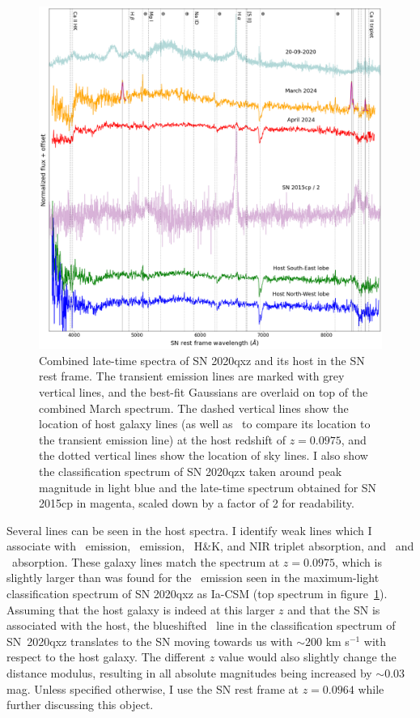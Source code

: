 \documentclass[a4paper,oneside,12pt, class=Latex/Classes/PhDthesisPSnPDF, crop=false]{standalone}
\begin{document}
\begin{figure}[h!]
    \centering
    \includegraphics[width=\textwidth]{../Images/chapter_5/2020qxz_spec.png}
    \caption[Spectra of SN 2020qxz.]{Combined late-time spectra of SN 2020qxz and its host in the SN rest frame. The transient emission lines are marked with grey vertical lines, and the best-fit Gaussians are overlaid on top of the combined March spectrum. The dashed vertical lines show the location of host galaxy lines (as well as \Hbeta\ to compare its location to the transient emission line) at the host redshift of $z=0.0975$, and the dotted vertical lines show the location of sky lines. I also show the classification spectrum of SN 2020qzx taken around peak magnitude in light blue and the late-time spectrum obtained for SN 2015cp in magenta, scaled down by a factor of 2 for readability.}
    \label{fig:2020qxz_spec}
\end{figure}

Several lines can be seen in the host spectra. I identify weak lines which I associate with \Halpha\ emission, \SIIF\ emission, \CaII\ H\&K, and NIR triplet absorption, and \NaID\ and \MgI\ absorption. These galaxy lines match the spectrum at $z=0.0975$, which is slightly larger than was found for the \Halpha\ emission seen in the maximum-light classification spectrum of SN 2020qxz as Ia-CSM (top spectrum in figure~\ref{fig:2020qxz_spec}). Assuming that the host galaxy is indeed at this larger $z$ and that the SN is associated with the host, the blueshifted \Halpha\ line in the classification spectrum of SN~2020qxz translates to the SN moving towards us with $\sim200$ km s$^{-1}$ with respect to the host galaxy. The different $z$ value would also slightly change the distance modulus, resulting in all absolute magnitudes being increased by $\sim0.03$ mag. Unless specified otherwise, I use the SN rest frame at $z=0.0964$ while further discussing this object.
\end{document}
